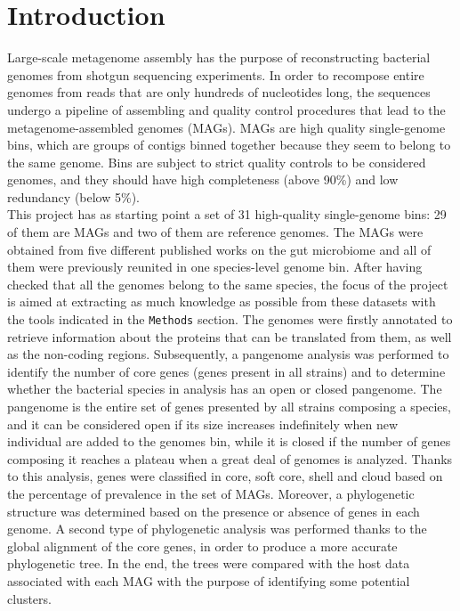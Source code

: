 \section*{Introduction}

Large-scale metagenome assembly has the purpose of reconstructing bacterial genomes from shotgun sequencing experiments. In order to recompose entire genomes from reads that are only hundreds of nucleotides long, the sequences undergo a pipeline of assembling and quality control procedures that lead to the metagenome-assembled genomes (MAGs). MAGs are high quality single-genome bins, which are groups of contigs binned together because they seem to belong to the same genome. Bins are subject to strict quality controls to be considered genomes, and they should have high completeness (above 90\%) and low redundancy (below 5\%).\\

This project has as starting point a set of 31 high-quality single-genome bins: 29 of them are MAGs and two of them are reference genomes. The MAGs were obtained from five different published works on the gut microbiome \cite{origin1,origin2,origin3,origin4,origin5} and all of them were previously reunited in one species-level genome bin. After having checked that all the genomes belong to the same species, the focus of the project is aimed at extracting as much knowledge as possible from these datasets with the tools indicated in the \texttt{Methods} section. The genomes were firstly annotated to retrieve information about the proteins that can be translated from them, as well as the non-coding regions. Subsequently, a pangenome analysis was performed to identify the number of core genes (genes present in all strains) and to determine whether the bacterial species in analysis has an open or closed pangenome. The pangenome is the entire set of genes presented by all strains composing a species, and it can be considered open if its size increases indefinitely when new individual are added to the genomes bin, while it is closed if the number of genes composing it reaches a plateau when a great deal of genomes is analyzed. Thanks to this analysis, genes were classified in core, soft core, shell and cloud based on the percentage of prevalence in the set of MAGs. Moreover, a phylogenetic structure was determined based on the presence or absence of genes in each genome. A second type of phylogenetic analysis was performed thanks to the global alignment of the core genes, in order to produce a more accurate phylogenetic tree. In the end, the trees were compared with the host data associated with each MAG with the purpose of identifying some potential clusters. 